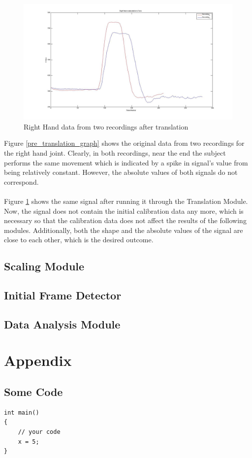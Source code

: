 \documentclass[10pt]{article}
\begin{document}
\begin{figure}[h]
\centering
\includegraphics[scale=0.3]{R_H_Data_Relative_Torso.jpg}
\caption{Right Hand data from two recordings after translation}
\label{post_translation_graph}
\end{figure}

\noindent
Figure \ref{pre_translation_graph} shows the original data from two recordings for the right hand joint. Clearly, in both recordings, near the end the subject performs the same movement which is indicated by a spike in signal's value from being relatively constant. However, the absolute values of both signals do not correspond.
\\\\
\noindent
Figure \ref{post_translation_graph} shows the same signal after running it through the Translation Module. Now, the signal does not contain the initial calibration data any more, which is necessary so that the calibration data does not affect the results of the following modules. Additionally, both the shape and the absolute values of the signal are close to each other, which is the desired outcome.

\clearpage
\subsection{Scaling Module}
\subsection{Initial Frame Detector}
\subsection{Data Analysis Module}

\clearpage
\section*{Appendix}
\subsection*{Some Code}
\begin{lstlisting}
int main()
{
	// your code
	x = 5;
}

\end{lstlisting}
\end{document}
